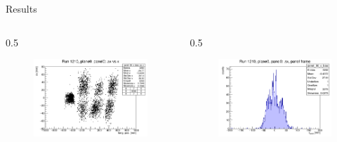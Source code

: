 \documentclass{beamer}[10pt]
\begin{document}
\begin{frame}{Results}
\begin{columns}
\begin{column}{0.5\framewidth}
      \begin{figure}[H]
        \centering
        \includegraphics[width= \textwidth]{figures/pdf/panel_00_x_bias_vs_x.png}
        \label{fig:enter-label}
    \end{figure}
    \end{column}
    \begin{column}{0.5\framewidth}
      \begin{figure}[H]
        \centering
        \includegraphics[width=  \textwidth]{figures/pdf/panel_00_x_bias.png}
        \label{fig:enter-label}
    \end{figure}
    \vspace{-12mm}


\end{column}
\end{columns}
\end{frame}
\end{document}
